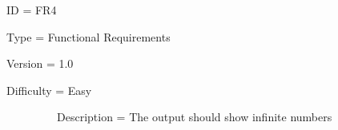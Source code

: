 \documentclass[12pt]{article}
\begin{document}
\begin{adjustwidth}{0.49in}{0.0in}
\begin{justify}
ID = FR4
\end{justify}\par

\end{adjustwidth}



\begin{adjustwidth}{0.49in}{0.0in}
\begin{justify}
Type = Functional Requirements
\end{justify}\par

\end{adjustwidth}



\begin{adjustwidth}{0.49in}{0.0in}
\begin{justify}
Version = 1.0
\end{justify}\par

\end{adjustwidth}



\begin{adjustwidth}{0.49in}{0.0in}
\begin{justify}
Difficulty = Easy
\end{justify}\par

\end{adjustwidth}



\ \ \ \ \ \ \ \ \ Description = The output should show infinite numbers\par



\vspace{\baselineskip}

\vspace{\baselineskip}

\vspace{\baselineskip}
\printbibliography
\end{document}

